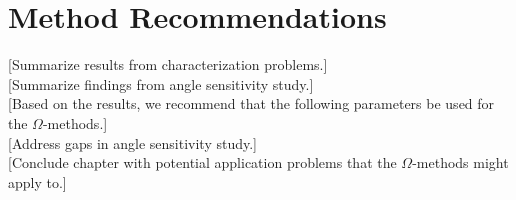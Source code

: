 \section{Method Recommendations}
\label{sec:method_recs}

[Summarize results from characterization problems.] \\

[Summarize findings from angle sensitivity study.] \\

[Based on the results, we recommend that the following parameters be used for
the $\Omega$-methods.] \\

[Address gaps in angle sensitivity study.] \\

[Conclude chapter with potential application problems that the $\Omega$-methods
might apply to.] \\
